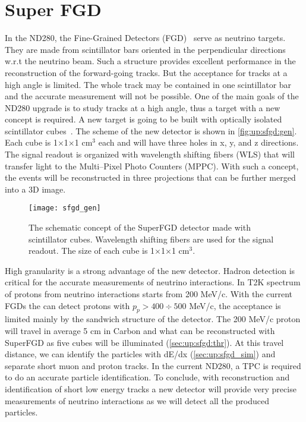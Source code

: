 \documentclass[main.tex]{subfiles}
\begin{document}
\renewcommand{\labelitemi}{\ding{226}}
\renewcommand{\labelitemii}{\ding{227}}

\newcommand{\sfgdx}{192}
\newcommand{\sfgdz}{184}
\newcommand{\sfgdy}{56}

\chapter{Super FGD}
\label{ch:up:sfgd}
In the ND280, the Fine-Grained Detectors (FGD)~\cite{Amaudruz2012} serve as neutrino targets. They are made from scintillator bars oriented in the perpendicular directions w.r.t the neutrino beam. Such a structure provides excellent performance in the reconstruction of the forward-going tracks. But the acceptance for tracks at a high angle is limited. The whole track may be contained in one scintillator bar and the accurate measurement will not be possible. One of the main goals of the ND280 upgrade is to study tracks at a high angle, thus a target with a new concept is required. A new target is going to be built with optically isolated scintillator cubes~\cite{Blondel2018}. The scheme of the new detector is shown in \autoref{fig:up:sfgd:gen}. Each cube is 1$\times$1$\times$1 $\text{cm}^3$ each and will have three holes in x, y, and z directions. The signal readout is organized with wavelength shifting fibers (WLS) that will transfer light to the Multi--Pixel Photo Counters (MPPC). With such a concept, the events will be reconstructed in three projections that can be further merged into a 3D image.

\begin{figure}[!ht]
	\centering
	\texttt{[image: sfgd\_gen]}
	\caption{The schematic concept of the SuperFGD detector made with scintillator cubes. Wavelength shifting fibers are used for the signal readout. The size of each cube is 1$\times$1$\times$1 $\text{cm}^3$.}
	\label{fig:up:sfgd:gen}
\end{figure}
High granularity is a strong advantage of the new detector. Hadron detection is critical for the accurate measurements of neutrino interactions. In T2K spectrum of protons from neutrino interactions starts from 200 MeV/c. With the current FGDs the can detect protons with $p_p > 400 \div 500 $ MeV/c, the acceptance is limited mainly by the sandwich structure of the detector. The 200 MeV/c proton will travel in average 5 cm in Carbon and what can be reconstructed with SuperFGD as five cubes will be illuminated (\autoref{sec:up:sfgd:thr}). At this travel distance, we can identify the particles with dE/dx (\autoref{sec:up:sfgd_sim}) and separate short muon and proton tracks. In the current ND280, a TPC is required to do an accurate particle identification. To conclude, with reconstruction and identification of short low energy tracks a new detector will provide very precise measurements of neutrino interactions as we will detect all the produced particles.
\end{document}

